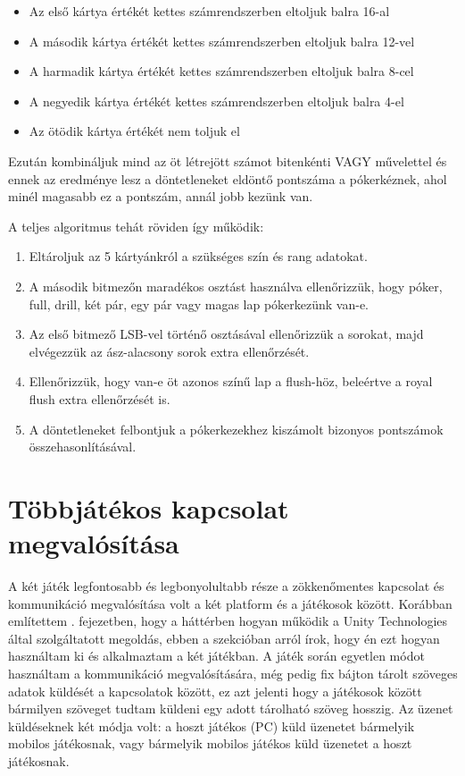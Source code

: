 \documentclass[]{thesis-ekf}
\theoremstyle{definition}
\theoremstyle{remark}
\begin{document}
\begin{enumerate}
\begin{itemize}
		\begin{itemize}
			\item Az első kártya értékét kettes számrendszerben eltoljuk balra 16-al
			\item A második kártya értékét kettes számrendszerben eltoljuk balra 12-vel
			\item A harmadik kártya értékét kettes számrendszerben eltoljuk balra 8-cel
			\item A negyedik kártya értékét kettes számrendszerben eltoljuk balra 4-el
			\item Az ötödik kártya értékét nem toljuk el
		\end{itemize}  
		Ezután kombináljuk mind az öt létrejött számot bitenkénti VAGY művelettel és ennek az eredménye lesz a döntetleneket eldöntő pontszáma a pókerkéznek, ahol minél magasabb ez a pontszám, annál jobb kezünk van.
	\end{itemize}
	
\end{enumerate}

A teljes algoritmus tehát röviden így működik:

\begin{enumerate}
	\item Eltároljuk az 5 kártyánkról a szükséges szín és rang adatokat.
	\item A második bitmezőn maradékos osztást használva ellenőrizzük, hogy póker, full, drill, két pár, egy pár vagy magas lap pókerkezünk van-e.
	\item Az első bitmező LSB-vel történő osztásával ellenőrizzük a sorokat, majd elvégezzük az ász-alacsony sorok extra ellenőrzését.
	\item Ellenőrizzük, hogy van-e öt azonos színű lap a flush-höz, beleértve a royal flush extra ellenőrzését is.
	\item A döntetleneket felbontjuk a pókerkezekhez kiszámolt bizonyos pontszámok összehasonlításával.
\end{enumerate}

\section{Többjátékos kapcsolat megvalósítása}
\label{sec-tobbjatekoskapcsolat}

A két játék legfontosabb és legbonyolultabb része a zökkenőmentes kapcsolat és kommunikáció megvalósítása volt a két platform és a játékosok között. Korábban említettem . fejezetben, hogy a háttérben hogyan működik a Unity Technologies által szolgáltatott megoldás, ebben a szekcióban arról írok, hogy én ezt hogyan használtam ki és alkalmaztam a két játékban. A játék során egyetlen módot használtam a kommunikáció megvalósítására, még pedig fix bájton tárolt szöveges adatok küldését a kapcsolatok között, ez azt jelenti hogy a játékosok között bármilyen szöveget tudtam küldeni egy adott tárolható szöveg hosszig. Az üzenet küldéseknek két módja volt: a hoszt játékos (PC) küld üzenetet bármelyik mobilos játékosnak, vagy bármelyik mobilos játékos küld üzenetet a hoszt játékosnak.
\end{document}
